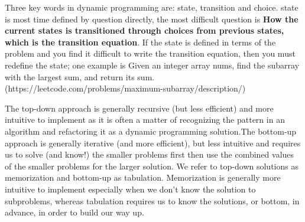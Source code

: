 \documentclass[a4paper,11pt,twoside]{book}
\begin{document}
	\par Three key words in dynamic programming are: state, transition and choice. state is most time defined by question directly,  the most difficult question is \textbf{How the current states is transitioned through choices from previous states, which is the transition equation}. If the state is defined in terms of the problem and you find it difficult to write the transition equation, then you must redefine the state; one example is Given an integer array nums, find the 
	subarray with the largest sum, and return its sum. (https://leetcode.com/problems/maximum-subarray/description/)
	
	
	\par The top-down approach is generally recursive (but less efficient) and more intuitive to implement as it is often a matter of recognizing the pattern in an algorithm and refactoring it as a dynamic programming solution.The bottom-up approach is generally iterative (and more efficient), but less intuitive and requires us to solve (and know!) the smaller problems first then use the combined values of the smaller problems for the larger solution. We refer to top-down solutions as memorization and bottom-up as tabulation. Memorization is generally more intuitive to implement especially when we don’t know the solution to subproblems, whereas tabulation requires us to know the solutions, or bottom, in advance, in order to build our way up.
	
	
%	
	
	
	
\end{document}
